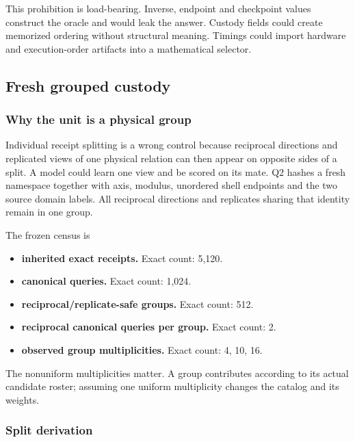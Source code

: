 This prohibition is load-bearing. Inverse, endpoint and checkpoint
values construct the oracle and would leak the answer. Custody fields
could create memorized ordering without structural meaning. Timings
could import hardware and execution-order artifacts into a mathematical
selector.

\subsection{Fresh grouped custody}\label{viii-ch07-fresh-grouped-custody}

\subsubsection{Why the unit is a physical
group}\label{viii-ch07-why-the-unit-is-a-physical-group}

Individual receipt splitting is a wrong control because reciprocal
directions and replicated views of one physical relation can then appear
on opposite sides of a split. A model could learn one view and be scored
on its mate. Q2 hashes a fresh namespace together with axis, modulus,
unordered shell endpoints and the two source domain labels. All
reciprocal directions and replicates sharing that identity remain in one
group.

The frozen census is

\begin{itemize}
\tightlist
\item
  \textbf{inherited exact receipts.} Exact count: 5,120.
\item
  \textbf{canonical queries.} Exact count: 1,024.
\item
  \textbf{reciprocal/replicate-safe groups.} Exact count: 512.
\item
  \textbf{reciprocal canonical queries per group.} Exact count: 2.
\item
  \textbf{observed group multiplicities.} Exact count: 4, 10, 16.
\end{itemize}

The nonuniform multiplicities matter. A group contributes according to
its actual candidate roster; assuming one uniform multiplicity changes
the catalog and its weights.

\subsubsection{Split derivation}\label{viii-ch07-split-derivation}

